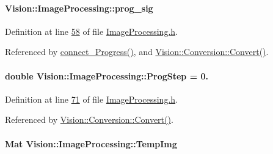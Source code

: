 \hypertarget{class_vision_1_1_image_processing_ac0c168e16365ff5941791f67ec895663}{}
\paragraph[{prog\+\_\+sig}]{ Vision\+::\+Image\+Processing\+::prog\+\_\+sig\hspace{0.3cm}{\ttfamily [protected]}}\label{class_vision_1_1_image_processing_ac0c168e16365ff5941791f67ec895663}


Definition at line \hyperlink{_image_processing_8h_source_l00058}{58} of file \hyperlink{_image_processing_8h_source}{Image\+Processing.\+h}.



Referenced by \hyperlink{_image_processing_8cpp_source_l00130}{connect\+\_\+\+Progress()}, and \hyperlink{_conversion_8cpp_source_l00086}{Vision\+::\+Conversion\+::\+Convert()}.

\hypertarget{class_vision_1_1_image_processing_a7438451f9a447a33e9f04bf8e73eae31}{}
\paragraph[{Prog\+Step}]{\setlength{\rightskip}{0pt plus 5cm}double Vision\+::\+Image\+Processing\+::\+Prog\+Step = 0.}\label{class_vision_1_1_image_processing_a7438451f9a447a33e9f04bf8e73eae31}


Definition at line \hyperlink{_image_processing_8h_source_l00071}{71} of file \hyperlink{_image_processing_8h_source}{Image\+Processing.\+h}.



Referenced by \hyperlink{_conversion_8cpp_source_l00086}{Vision\+::\+Conversion\+::\+Convert()}.

\hypertarget{class_vision_1_1_image_processing_a5371ad8d6f7aac9d43ee5c902ade7435}{}
\paragraph[{Temp\+Img}]{\setlength{\rightskip}{0pt plus 5cm}Mat Vision\+::\+Image\+Processing\+::\+Temp\+Img\hspace{0.3cm}{\ttfamily [protected]}}\label{class_vision_1_1_image_processing_a5371ad8d6f7aac9d43ee5c902ade7435}


